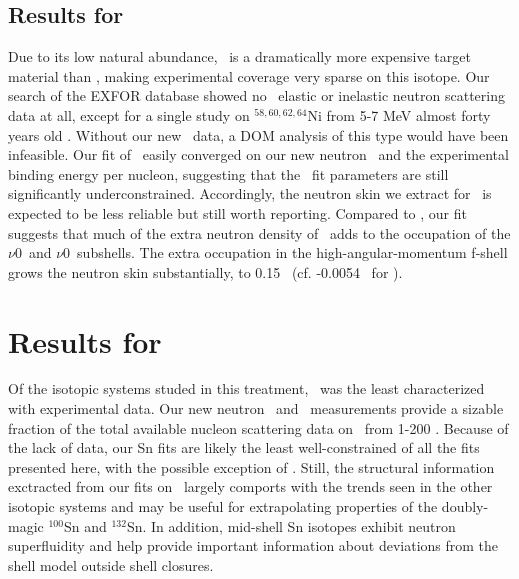 \subsection{Results for \niFour}
Due to its low natural abundance, \niFour\ is a dramatically more expensive target material than
\niEight, making experimental coverage very sparse on this isotope. Our search
of the EXFOR database showed
no \niFour\ elastic or inelastic neutron scattering data at all, except for a single study on
$^{58,60,62,64}$Ni from 5-7 MeV almost forty years old \cite{Korzh80}.
Without our new \tot\ data, a DOM analysis of this type would have been infeasible. Our
fit of \niFour\ easily converged on our new neutron \tot\ and the
experimental binding energy per nucleon, suggesting
that the \niFour\ fit parameters are still
significantly underconstrained. Accordingly, the neutron skin
we extract for \niFour\ is expected to be less
reliable but still worth reporting. Compared to \niEight, our fit suggests that much of the extra 
neutron density of \niFour\ adds to the occupation
of the $\nu$0\fSeven\ and $\nu$0\fFive\ subshells. 
The extra occupation in the high-angular-momentum f-shell grows the neutron
skin substantially, to 0.15 \femto\meter\ (cf. -0.0054 \femto\meter\ for \niEight).

\section{Results for \snTwelveFour}
Of the isotopic systems studed in this treatment, \snTwelveFour\ was the least characterized with 
experimental data. Our new neutron \tot\ and \el\ measurements provide a sizable fraction
of the total available nucleon scattering data on \snTwelveFour\ from 1-200 \mega\electronvolt.
Because of the lack of data, our Sn fits are likely the least well-constrained of all the fits
presented here, with the possible exception of \niFour.
Still, the structural information exctracted from
our fits on \snTwelveFour\ largely comports with the trends seen in the other isotopic systems and
may be useful for extrapolating properties of the doubly-magic $^{100}$Sn and
$^{132}$Sn. In addition, mid-shell Sn isotopes exhibit neutron superfluidity
and help provide important information
about deviations from the shell model outside shell closures. 

